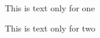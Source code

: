 \documentclass{article}
\begin{document}
\ifOne This is text only for one\fi

\ifTwo This is text only for two\fi
\end{document}
